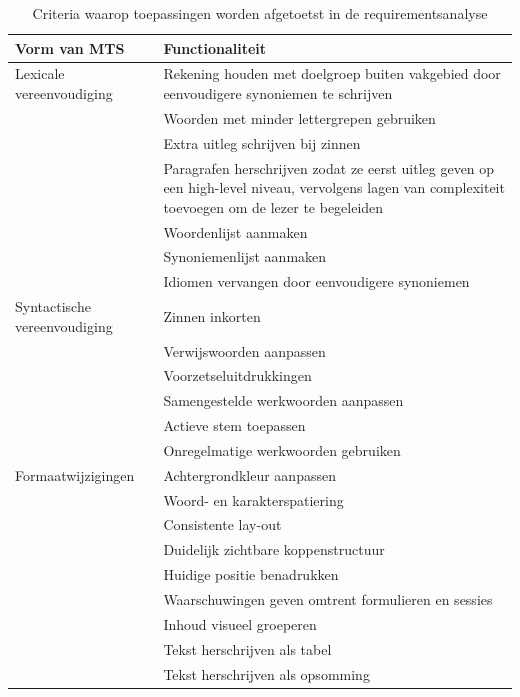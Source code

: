 \begin{center}
	\begin{table}[H]
		\begin{tabular}{ | m{4cm} | m{11cm} | } 
			\hline
			\textbf{Vorm van MTS} & \textbf{Functionaliteit} \\
			\hline
			Lexicale vereenvoudiging & Rekening houden met doelgroep buiten vakgebied door eenvoudigere synoniemen te schrijven \\
			& Woorden met minder lettergrepen gebruiken \\
			& Extra uitleg schrijven bij zinnen \\
			& Paragrafen herschrijven zodat ze eerst uitleg geven op een high-level niveau, vervolgens lagen van complexiteit toevoegen om de lezer te begeleiden \\
			& Woordenlijst aanmaken \\
			& Synoniemenlijst aanmaken \\
			& Idiomen vervangen door eenvoudigere synoniemen \\
			\hline
			Syntactische vereenvoudiging & Zinnen inkorten \\
			& Verwijswoorden aanpassen \\
			& Voorzetseluitdrukkingen \\
			& Samengestelde werkwoorden aanpassen \\
			& Actieve stem toepassen \\
			& Onregelmatige werkwoorden gebruiken \\
			\hline
			Formaatwijzigingen & Achtergrondkleur aanpassen \\
			& Woord- en karakterspatiering \\
			& Consistente lay-out \\
			& Duidelijk zichtbare koppenstructuur \\
			& Huidige positie benadrukken \\
			& Waarschuwingen geven omtrent formulieren en sessies \\
			& Inhoud visueel groeperen \\
			& Tekst herschrijven als tabel \\
			& Tekst herschrijven als opsomming \\
			\hline
		\end{tabular}
		\label{table:criteria-requirementsanalysis}	
		\caption{Criteria waarop toepassingen worden afgetoetst in de requirementsanalyse}
	\end{table}
\end{center}

